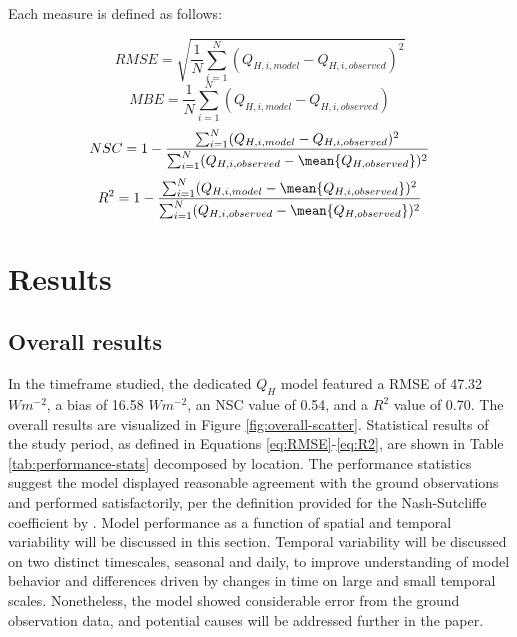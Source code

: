 Each measure is defined as follows:

\begin{equation} \label{eq:RMSE}
    RMSE = \sqrt{\frac{1}{N} \sum_{i=1}^{N}(Q_{H, i, model} - Q_{H, i, observed})^2}
\end{equation}
\begin{equation} \label{eq:MBE}
    MBE = \frac{1}{N} \sum_{i=1}^{N} (Q_{H, i, model} - Q_{H, i, observed})
\end{equation}
\begin{equation} \label{eq:NSC}
    NSC = 1 - \frac{\sum_{i=1}^{N} (Q_{H, i, model} - Q_{H, i, observed})^2}{\sum_{i=1}^{N}(Q_{H, i, observed} - \mean{Q_{H, observed}})^2}
\end{equation} 
\begin{equation} \label{eq:R2}
    R^2 = 1 - \frac{\sum_{i=1}^{N}(Q_{H, i, model} - \mean{Q_{H, i, observed}})^2}{\sum_{i=1}^{N}(Q_{H, i, observed} - \mean{Q_{H, observed}})^2}
\end{equation}

\section{Results}

\subsection{Overall results}
In the timeframe studied, the dedicated $Q_H$ model featured a RMSE of 47.32 $W m^{-2}$, a bias of 16.58 $W m^{-2}$, an NSC value of 0.54, and a $R^2$ value of 0.70. The overall results are visualized in Figure \ref{fig:overall-scatter}. Statistical results of the study period, as defined in Equations \ref{eq:RMSE}-\ref{eq:R2}, are shown in Table \ref{tab:performance-stats} decomposed by location. The performance statistics suggest the model displayed reasonable agreement with the ground observations and performed satisfactorily, per the definition provided for the Nash-Sutcliffe coefficient by \citet{Moriasi_2007}.  Model performance as a function of spatial and temporal variability will be discussed in this section. Temporal variability will be discussed on two distinct timescales, seasonal and daily, to improve understanding of model behavior and differences driven by changes in time on large and small temporal scales.  Nonetheless, the model showed considerable error from the ground observation data, and potential causes will be addressed further in the paper. 

